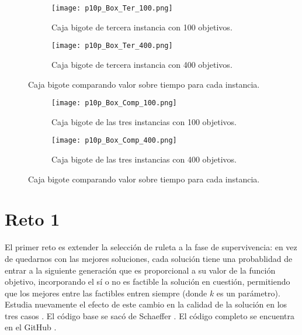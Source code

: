 \documentclass{article}
\begin{document}
\begin{figure}[H]
\centering
\begin{subfigure}[b]{0.40\linewidth}
\texttt{[image: p10p\_Box\_Ter\_100.png]}
\caption{Caja bigote de tercera instancia con 100 objetivos.}
\end{subfigure}
\begin{subfigure}[b]{0.40\linewidth}
\texttt{[image: p10p\_Box\_Ter\_400.png]}
\caption{Caja bigote de tercera instancia con 400 objetivos.}
\end{subfigure}
\caption{Caja bigote comparando valor sobre tiempo para cada instancia.}
\label{fig:westminster}
\end{figure}

\begin{figure}[H]
\centering
\begin{subfigure}[b]{0.40\linewidth}
\texttt{[image: p10p\_Box\_Comp\_100.png]}
\caption{Caja bigote de las tres instancias con 100 objetivos.}
\end{subfigure}
\begin{subfigure}[b]{0.40\linewidth}
\texttt{[image: p10p\_Box\_Comp\_400.png]}
\caption{Caja bigote de las tres instancias con 400 objetivos.}
\end{subfigure}
\caption{Caja bigote comparando valor sobre tiempo para cada instancia.}
\label{fig:westminster}
\end{figure}

\section{Reto 1}
El primer reto es extender la selección de ruleta a la fase de supervivencia: en vez de quedarnos con las mejores soluciones, cada solución tiene una probablidad de entrar a la siguiente generación que es proporcional a su valor de la función objetivo, incorporando el sí o no es factible la solución en cuestión, permitiendo que los  mejores entre las factibles entren siempre (donde $k$ es un parámetro). Estudia nuevamente el efecto de este cambio en la calidad de la solución en los tres casos \cite{Satu_Elisa_Schaeffer}.
El código base se sacó de Schaeffer \cite{Elisa_Schaeffer}. El código completo se encuentra en el GitHub \cite{Denisse_Leyva}.
\end{document}
